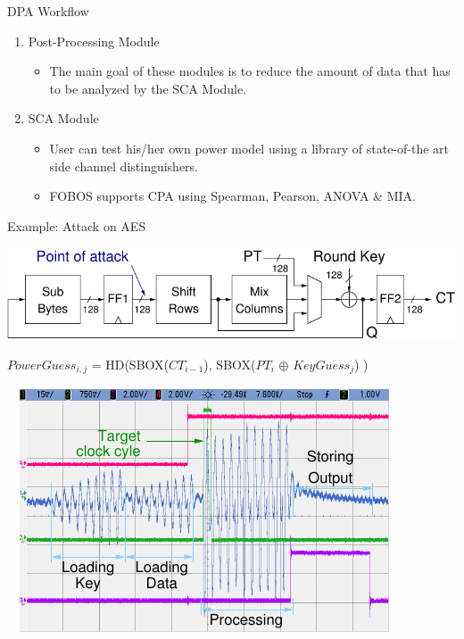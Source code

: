 \documentclass[xcolor=pdftex,dvipsnames,table,final]{beamer}
\begin{document}
\begin{frame}[fragile]{}
\begin{columns}[t]
\begin{column}{.31\linewidth}
\begin{block}{DPA Workflow}
\begin{enumerate}
\begin{itemize}
          \end{itemize}
          \item Post-Processing Module
          \begin{itemize}
            \item The main goal of these modules is to reduce the amount of data that 
                  has to be analyzed by the SCA Module.
          \end{itemize}
          \item SCA Module
          \begin{itemize}
            \item User can test his/her own power model using a library of state-of-the art side channel
                  distinguishers.
            \item FOBOS supports CPA using Spearman, Pearson, ANOVA \& MIA.
          \end{itemize}
        \end{enumerate}

       \end{block}
       
       \begin{block}{Example: Attack on AES}
        \vspace{-1ex}
         \begin{center}
           \includegraphics[width=0.9\linewidth]{../figures/aes128}

           {\small $PowerGuess_{i, j}$ = HD(SBOX($CT_{i-1}$), SBOX($PT_{i}$ $\oplus$ $KeyGuess_{j}$) )}
         \end{center}
	 \begin{minipage}[t]{0.49\linewidth}
			~~\includegraphics[width=0.80\linewidth]{../figures/oscilloscope-all-4ch} 
	 

\end{minipage}
\end{block}
\end{column}
\end{columns}
\end{frame}
\end{document}
